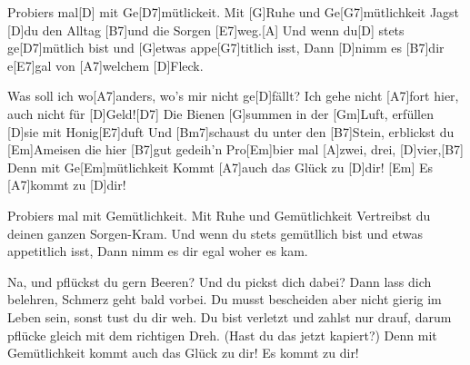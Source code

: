 

\vspace{-0.6em}

\begin{guitar}
	Probiers mal[D] mit Ge[D7]mütlickeit. Mit [G]Ruhe und Ge[G7]mütlichkeit
	Jagst [D]du den Alltag [B7]und die Sorgen [E7]weg.[A]{}
	Und wenn du[D] stets ge[D7]mütlich bist und [G]etwas appe[G7]titlich isst,
	Dann [D]nimm es [B7]dir e[E7]gal von [A7]welchem [D]Fleck.\vspace{-0.2em}
	
	Was soll ich wo[A7]anders, wo's mir nicht ge[D]fällt?
	Ich gehe nicht [A7]fort hier, auch nicht für [D]Geld![D7]{}
	Die Bienen [G]summen in der [Gm]Luft, erfüllen [D]sie mit Honig[E7]duft
	Und [Bm7]schaust du unter den [B7]Stein, erblickst du [Em]Ameisen die hier [B7]gut gedeih'n
	Pro[Em]bier mal [A]zwei, drei, [D]vier,[B7]{}
	Denn mit Ge[Em]mütlichkeit Kommt [A7]auch das Glück zu [D]dir!
	[Em] Es [A7]kommt zu [D]dir!\vspace{-0.2em}
	
	Probiers mal mit Gemütlichkeit. Mit Ruhe und Gemütlichkeit
	Vertreibst du deinen ganzen Sorgen-Kram.
	Und wenn du stets gemütllich bist und etwas appetitlich isst,
	Dann nimm es dir egal woher es kam.\vspace{-0.2em}
	
	Na, und pflückst du gern Beeren? Und du pickst dich dabei?
	Dann lass dich belehren, Schmerz geht bald vorbei.
	Du musst bescheiden aber nicht gierig im Leben sein, sonst tust du dir weh.
	Du bist verletzt und zahlst nur drauf, darum pflücke gleich mit dem richtigen Dreh.\vspace{-0.2em}
	(Hast du das jetzt kapiert?)
	Denn mit Gemütlichkeit kommt auch das Glück zu dir!
	Es kommt zu dir!\vspace{-1em}
\end{guitar}